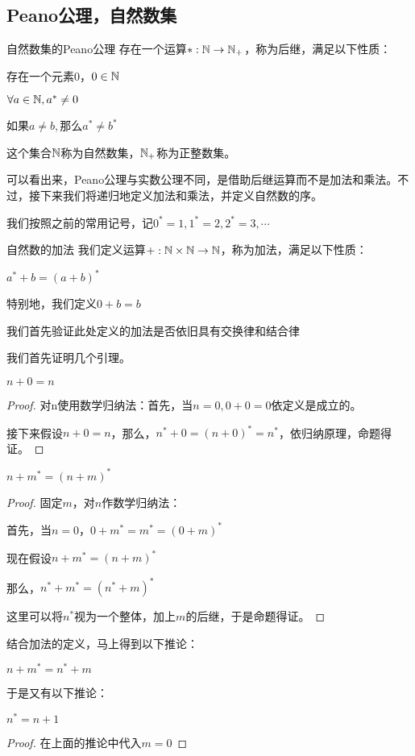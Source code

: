 \documentclass[12pt, a4paper, oneside, UTF8]{ctexbook}
\begin{document}
		\subsection{Peano公理，自然数集}
			\begin{para}{0}
					\begin{defn}{自然数集的Peano公理}{}
						存在一个运算$*:\mathbb{N} \rightarrow \mathbb{N}_+$，称为后继，满足以下性质：
						
						 存在一个元素$0$，$0 \in \mathbb{N}$
						
						 $\forall a \in \mathbb{N} ,a^* \neq 0$
						
						 如果$a \neq b,$那么$a^* \neq b^*$
						
						这个集合$\mathbb{N}$称为自然数集，$\mathbb{N}_+$称为正整数集。
					\end{defn}
					可以看出来，Peano公理与实数公理不同，是借助后继运算而不是加法和乘法。不过，接下来我们将递归地定义加法和乘法，并定义自然数的序。
					
					我们按照之前的常用记号，记$0^*=1,1^*=2,2^*=3,\cdots$
					\begin{defn}{自然数的加法}{}
						我们定义运算$+:\mathbb{N} \times \mathbb{N} \rightarrow \mathbb{N}$，称为加法，满足以下性质：
						
						$a^*+b=(a+b)^*$
						
						特别地，我们定义$0+b=b$
					\end{defn}
					我们首先验证此处定义的加法是否依旧具有交换律和结合律
					
					我们首先证明几个引理。
					\begin{lemma}{}{}
						$n+0=n$
					\end{lemma}
					\begin{proof}
						对n使用数学归纳法：首先，当$n=0,0+0=0$依定义是成立的。
						
						接下来假设$n+0=n$，那么，$n^*+0=(n+0)^*=n^*$，依归纳原理，命题得证。
					\end{proof}
					\begin{lemma}{}{}
						$n+m^{*}=(n+m)^{*}$
					\end{lemma}
					\begin{proof}
						固定$m$，对$n$作数学归纳法：
						
						首先，当$n=0$，$0+m^*=m^*=(0+m)^*$
						
						现在假设$n+m^*=(n+m)^*$
						
						那么，$n^*+m^*=\left(n^*+m\right)^*$
						
						这里可以将$n^*$视为一个整体，加上$m$的后继，于是命题得证。
					\end{proof}
					结合加法的定义，马上得到以下推论：
					\begin{corollary}{}{}
						$n+m^*=n^*+m$
					\end{corollary}
					于是又有以下推论：
					\begin{corollary}{}{}
						$n^*=n+1$
					\end{corollary}
					\begin{proof}
						在上面的推论中代入$m=0$
						

\end{proof}
\end{para}
\end{document}
